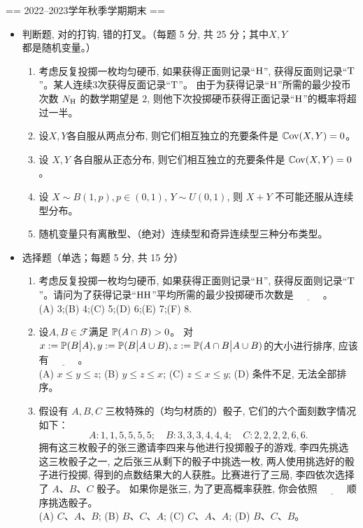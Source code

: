 == 2022--2023学年秋季学期期末 ==
\begin{itemize}
    \item [一、]判断题, 对的打钩, 错的打叉。（每题 5 分, 共 25 分；其中$X,Y$都是随机变量。）
    \begin{enumerate}
        \item [(1)]考虑反复投掷一枚均匀硬币, 如果获得正面则记录“$\mathrm{H}$”, 
        获得反面则记录“$\mathrm{T}$”。某人连续$ 3 $次获得反面记录“$\mathrm{T}$”。
        由于为获得记录“$\mathrm{H}$”所需的最少投币次数 $N_{\mathrm{H}}$ 的数学期望是 $2$, 
        则他下次投掷硬币获得正面记录“$\mathrm{H}$”的概率将超过一半。
        \item [(2)]设$ X, Y $各自服从两点分布, 则它们相互独立的充要条件是 $\mathbb{C}\mathrm{ov} (X, Y ) = 0$。
        \item [(3)]设 $X, Y$ 各自服从正态分布, 则它们相互独立的充要条件是 $\mathbb{C}\mathrm{ov} (X, Y ) = 0$。
        \item [(4)]设 $X \sim B(1, p), p \in (0, 1)$, $Y \sim U(0, 1)$, 
        则 $X+Y$ 不可能还服从连续型分布。
        \item [(5)]随机变量只有离散型、（绝对）连续型和奇异连续型三种分布类型。
    \end{enumerate}
    \item [二、]选择题（单选；每题 5 分, 共 15 分）
    \begin{enumerate}
        \item [(1)] 考虑反复投掷一枚均匀硬币, 如果获得正面则记录“$\mathrm{H}$”, 
        获得反面则记录“$\mathrm{T}$”。请问为了获得记录“$\mathrm{H}\mathrm{H}$”平均所需的最少投掷硬币次数是$\underline{\qquad\quad}$。\\
        (A) 3;\quad (B) 4;\quad (C) 5;\quad (D) 6;\quad (E) 7;\quad (F) 8.
        \item [(2)] 设$ A, B \in \mathcal{F} $满足 $\mathbb{P}(A \cap B) > 0$。
        对 $x := \mathbb{P}(B \big| A), y := \mathbb{P}(B \big| A \cup B), 
        z := \mathbb{P}(A \cap B \big| A \cup B)$的大小进行排序, 应该有$\underline{\qquad\quad}$。\\
        (A) $x\le y \le z$; (B) $y\le z \le x$; (C) $z\le x \le y$; (D) 条件不足, 无法全部排序。
        \item [(3)]假设有 $A, B, C$ 三枚特殊的（均匀材质的）骰子, 它们的六个面刻数字情况如下：
\[A : 1, 1, 5, 5, 5, 5;\quad B : 3, 3, 3, 4, 4, 4;\quad C : 2, 2, 2, 2, 6, 6.\]
拥有这三枚骰子的张三邀请李四来与他进行投掷骰子的游戏, 李四先挑选这三枚骰子之一, 
之后张三从剩下的骰子中挑选一枚, 两人使用挑选好的骰子进行投掷, 
得到的点数结果大的人获胜。比赛进行了三局, 李四依次选择了 $A、B、C$ 骰子。
如果你是张三, 为了更高概率获胜, 你会依照$\underline{\qquad\quad}$顺序挑选骰子。\\
        (A) $C、A、B$; (B) $B、C、A$; 
        (C) $C、A、A$; (D) $B、C、B$。


\end{enumerate}
\end{itemize}
